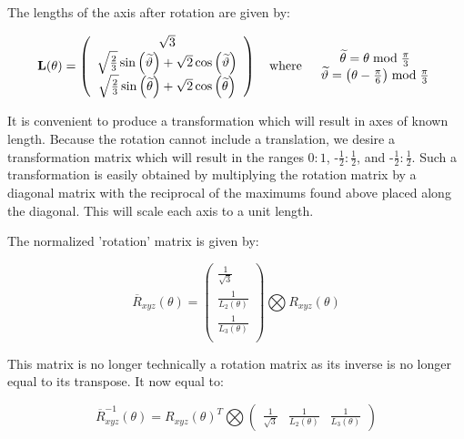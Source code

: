 The lengths of the axis after rotation are given by:

\begin{equation}\label{eq:L}
\mathbf{L}(\theta) = \left(
\begin{array}{c}
\sqrt{3} \\
 \sqrt{\frac{2}{3}} \sin \left(\widetilde{\vartheta}\right) + \sqrt{2} \cos \left(\widetilde{\vartheta}\right) \\  
\sqrt{\frac{2}{3}} \sin \left(\widetilde{\theta}\right) + \sqrt{2} \cos \left(\widetilde{\theta}\right) 
\end{array}
\right)
\quad \text{where}  \quad 
\begin{array}{c}
\widetilde{\theta} = \theta  \bmod \frac{\pi }{3} \\ 
\widetilde{\vartheta} = \left(\theta - \frac{\pi}{6}\right) \bmod \frac{\pi }{3}
\end{array}
\end{equation}

It is convenient to produce a transformation which will result in axes of known length. Because the rotation cannot include a translation, we desire a transformation matrix which will result in the ranges $0:1$, -$\frac{1}2:\frac{1}2$, and -$\frac{1}2:\frac{1}2$. Such a transformation is easily obtained by multiplying the rotation matrix by a diagonal matrix with the reciprocal of the maximums found above placed along the diagonal. This will scale each axis to a unit length.

The normalized 'rotation' matrix is given by:


\begin{equation}\label{eq:NormRxyz3}
 \overline{R}_{xyz}(\theta) =
\left(
\begin{array}{c}
 \frac{1}{\sqrt{3}}  \\
 \frac{1}{L_2(\theta)} \\
 \frac{1}{L_3(\theta) }  \\
\end{array}
\right)
\bigotimes
R_{xyz}(\theta)
\end{equation}

This matrix is no longer technically a rotation matrix as its inverse is no longer equal to its transpose. It now equal to:

\begin{equation}\label{eq:NormRxyz3Inverse}
 \overline{R}_{xyz}^{-1}(\theta) =
 R_{xyz}(\theta)^{T} \bigotimes
\left(
\begin{array}{ccc}
 \frac{1}{\sqrt{3}}  &
 \frac{1}{L_2(\theta)} &
 \frac{1}{L_3(\theta) }
\end{array}
\right)
\end{equation}

